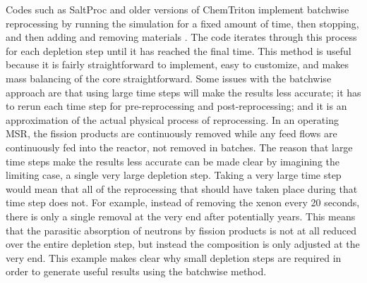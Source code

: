 Codes such as SaltProc and older versions of ChemTriton implement batchwise reprocessing by running the simulation for a fixed amount of time, then stopping, and then adding and removing materials \cite{rykhlevskii_modeling_2019, betzler_molten_2017}. The code iterates through this process for each depletion step until it has reached the final time. This method is useful because it is fairly straightforward to implement, easy to customize, and makes mass balancing of the core straightforward. Some issues with the batchwise approach are that using large time steps will make the results less accurate; it has to rerun each time step for pre-reprocessing and post-reprocessing; and it is an approximation of the actual physical process of reprocessing.
In an operating MSR, the fission products are continuously removed while any feed flows are continuously fed into the reactor, not removed in batches.
The reason that large time steps make the results less accurate can be made clear by imagining the limiting case, a single very large depletion step.
Taking a very large time step would mean that all of the reprocessing that should have taken place during that time step does not.
For example, instead of removing the xenon every 20 seconds, there is only a single removal at the very end after potentially years.
This means that the parasitic absorption of neutrons by fission products is not at all reduced over the entire depletion step, but instead the composition is only adjusted at the very end.
This example makes clear why small depletion steps are required in order to generate useful results using the batchwise method.


